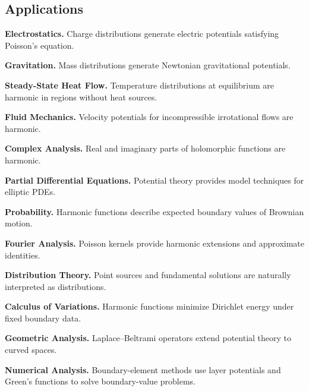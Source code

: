 \subsection{Applications}
\label{subsec:potential-theory-applications}

\begin{applicationbox}
\textbf{Electrostatics.}
Charge distributions generate electric potentials satisfying Poisson's
equation.

\medskip

\textbf{Gravitation.}
Mass distributions generate Newtonian gravitational potentials.

\medskip

\textbf{Steady-State Heat Flow.}
Temperature distributions at equilibrium are harmonic in regions without
heat sources.

\medskip

\textbf{Fluid Mechanics.}
Velocity potentials for incompressible irrotational flows are harmonic.

\medskip

\textbf{Complex Analysis.}
Real and imaginary parts of holomorphic functions are harmonic.

\medskip

\textbf{Partial Differential Equations.}
Potential theory provides model techniques for elliptic PDEs.

\medskip

\textbf{Probability.}
Harmonic functions describe expected boundary values of Brownian motion.

\medskip

\textbf{Fourier Analysis.}
Poisson kernels provide harmonic extensions and approximate identities.

\medskip

\textbf{Distribution Theory.}
Point sources and fundamental solutions are naturally interpreted as
distributions.

\medskip

\textbf{Calculus of Variations.}
Harmonic functions minimize Dirichlet energy under fixed boundary data.

\medskip

\textbf{Geometric Analysis.}
Laplace--Beltrami operators extend potential theory to curved spaces.

\medskip

\textbf{Numerical Analysis.}
Boundary-element methods use layer potentials and Green's functions to
solve boundary-value problems.
\end{applicationbox}

